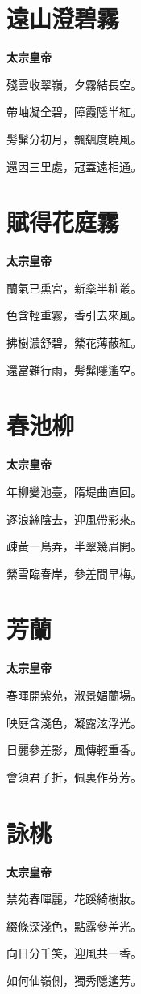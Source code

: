 \documentclass[12pt,a4paper]{ctexbook}
\begin{document}
\section{遠山澄碧霧}
\textbf{太宗皇帝}\par\vspace{0.5em}
殘雲收翠嶺，夕霧結長空。\par
帶岫凝全碧，障霞隱半紅。\par
髣髴分初月，飄颻度曉風。\par
還因三里處，冠蓋遠相通。\par

\section{賦得花庭霧}
\textbf{太宗皇帝}\par\vspace{0.5em}
蘭氣已熏宮，新橤半粧叢。\par
色含輕重霧，香引去來風。\par
拂樹濃舒碧，縈花薄蔽紅。\par
還當雜行雨，髣髴隱遙空。\par

\section{春池柳}
\textbf{太宗皇帝}\par\vspace{0.5em}
年柳變池臺，隋堤曲直回。\par
逐浪絲陰去，迎風帶影來。\par
疎黃一鳥弄，半翠幾眉開。\par
縈雪臨春岸，參差間早梅。\par

\section{芳蘭}
\textbf{太宗皇帝}\par\vspace{0.5em}
春暉開紫苑，淑景媚蘭場。\par
映庭含淺色，凝露泫浮光。\par
日麗參差影，風傳輕重香。\par
會須君子折，佩裏作芬芳。\par

\section{詠桃}
\textbf{太宗皇帝}\par\vspace{0.5em}
禁苑春暉麗，花蹊綺樹妝。\par
綴條深淺色，點露參差光。\par
向日分千笑，迎風共一香。\par
如何仙嶺側，獨秀隱遙芳。\par
\end{document}
